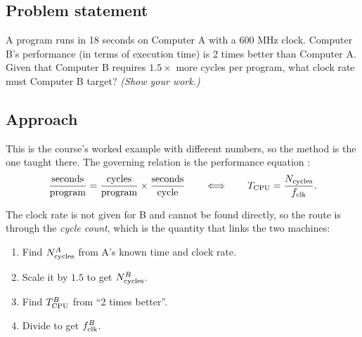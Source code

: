 





\subsection*{Problem statement}

A program runs in 18 seconds on Computer A with a 600 MHz clock. Computer B's
performance (in terms of execution time) is 2 times better than Computer A.
Given that Computer B requires $1.5\times$ more cycles per program, what clock
rate must Computer B target? \emph{(Show your work.)}

\subsection*{Approach}

This is the course's worked example  with
different numbers, so the method is the one taught there. The governing relation
is the performance equation :
\begin{equation}
  \frac{\text{seconds}}{\text{program}}
  = \frac{\text{cycles}}{\text{program}} \times \frac{\text{seconds}}{\text{cycle}}
  \qquad\Longleftrightarrow\qquad
  T_{\mathrm{CPU}} = \frac{N_{\mathrm{cycles}}}{f_{\mathrm{clk}}}.
  \label{eq:perf}
\end{equation}

The clock rate is not given for B and cannot be found directly, so the route is
through the \emph{cycle count}, which is the quantity that links the two
machines:

\begin{enumerate}
  \item Find $N_{\mathrm{cycles}}^{A}$ from A's known time and clock rate.
  \item Scale it by $1.5$ to get $N_{\mathrm{cycles}}^{B}$.
  \item Find $T_{\mathrm{CPU}}^{B}$ from ``2 times better''.
  \item Divide to get $f_{\mathrm{clk}}^{B}$.
\end{enumerate}

